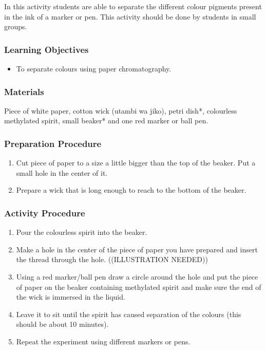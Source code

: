 In this activity students are able to separate the different colour pigments present in the ink of a marker or pen. This activity should be done by students in small groups.
\subsubsection*{Learning Objectives}
\begin{itemize}

\item{To separate colours using paper chromatography.}

\end{itemize}

\subsubsection*{Materials}
Piece of white paper, cotton wick (utambi wa jiko), petri dish*, colourless methylated spirit, small beaker* and one red marker or ball pen.

\subsubsection*{Preparation Procedure}
\begin{enumerate}
\item{Cut piece of paper to a size a little bigger than the top of the beaker. Put a small hole in the center of it.}
\item{Prepare a wick that is long enough to reach to the bottom of the beaker.}
\end{enumerate}

\subsubsection*{Activity Procedure}
\begin{enumerate}
\item{Pour the colourless spirit into the beaker.}
\item{Make a hole in the center of the piece of paper you have prepared and insert the thread through the hole. ((ILLUSTRATION NEEDED)) }
\item{Using a red marker/ball pen draw a circle around the hole and put the piece of paper on the beaker containing methylated spirit and make sure the end of the wick is immersed in the liquid.}
\item{Leave it to sit until the spirit has caused separation of the colours (this should be about 10 minutes).}
\item{Repeat the experiment using different markers or pens.}
\end{enumerate}

